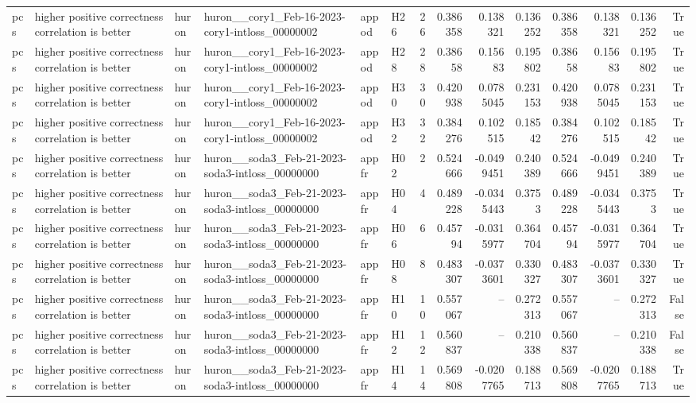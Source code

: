 \begin{longtable}{llllllrrrrrrrr}
pcs & higher positive correctness correlation is better & huron & huron\_\_cory1\_Feb-16-2023-cory1-intloss\_00000002 & appod & H26 & 26 & 0.386358 & 0.138321 & 0.136252 & 0.386358 & 0.138321 & 0.136252 & True \\
pcs & higher positive correctness correlation is better & huron & huron\_\_cory1\_Feb-16-2023-cory1-intloss\_00000002 & appod & H28 & 28 & 0.38658 & 0.15683 & 0.195802 & 0.38658 & 0.15683 & 0.195802 & True \\
pcs & higher positive correctness correlation is better & huron & huron\_\_cory1\_Feb-16-2023-cory1-intloss\_00000002 & appod & H30 & 30 & 0.420938 & 0.0785045 & 0.231153 & 0.420938 & 0.0785045 & 0.231153 & True \\
pcs & higher positive correctness correlation is better & huron & huron\_\_cory1\_Feb-16-2023-cory1-intloss\_00000002 & appod & H32 & 32 & 0.384276 & 0.102515 & 0.18542 & 0.384276 & 0.102515 & 0.18542 & True \\
pcs & higher positive correctness correlation is better & huron & huron\_\_soda3\_Feb-21-2023-soda3-intloss\_00000000 & appfr & H02 & 2 & 0.524666 & -0.0499451 & 0.240389 & 0.524666 & -0.0499451 & 0.240389 & True \\
pcs & higher positive correctness correlation is better & huron & huron\_\_soda3\_Feb-21-2023-soda3-intloss\_00000000 & appfr & H04 & 4 & 0.489228 & -0.0345443 & 0.3753 & 0.489228 & -0.0345443 & 0.3753 & True \\
pcs & higher positive correctness correlation is better & huron & huron\_\_soda3\_Feb-21-2023-soda3-intloss\_00000000 & appfr & H06 & 6 & 0.45794 & -0.0315977 & 0.364704 & 0.45794 & -0.0315977 & 0.364704 & True \\
pcs & higher positive correctness correlation is better & huron & huron\_\_soda3\_Feb-21-2023-soda3-intloss\_00000000 & appfr & H08 & 8 & 0.483307 & -0.0373601 & 0.330327 & 0.483307 & -0.0373601 & 0.330327 & True \\
pcs & higher positive correctness correlation is better & huron & huron\_\_soda3\_Feb-21-2023-soda3-intloss\_00000000 & appfr & H10 & 10 & 0.557067 & -- & 0.272313 & 0.557067 & -- & 0.272313 & False \\
pcs & higher positive correctness correlation is better & huron & huron\_\_soda3\_Feb-21-2023-soda3-intloss\_00000000 & appfr & H12 & 12 & 0.560837 & -- & 0.210338 & 0.560837 & -- & 0.210338 & False \\
pcs & higher positive correctness correlation is better & huron & huron\_\_soda3\_Feb-21-2023-soda3-intloss\_00000000 & appfr & H14 & 14 & 0.569808 & -0.0207765 & 0.188713 & 0.569808 & -0.0207765 & 0.188713 & True \\

\end{longtable}
